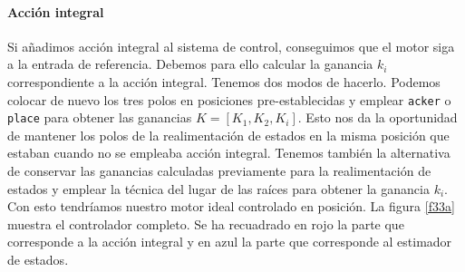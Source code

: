 \documentclass[10pt,a4paper]{report}
\begin{document}
\paragraph{Acción integral} Si añadimos acción integral al sistema de control, conseguimos que el motor siga a la entrada de referencia. Debemos para ello calcular la ganancia $k_i$ correspondiente a la acción integral. Tenemos dos modos de hacerlo. Podemos colocar de nuevo los tres polos en posiciones pre-establecidas y emplear \texttt{acker} o \texttt{place} para obtener las ganancias $K = [K_1,K_2,K_i]$. Esto nos da la oportunidad de mantener los polos de la realimentación de estados en la misma posición que estaban cuando no se empleaba acción integral. Tenemos también la alternativa de conservar las ganancias calculadas previamente para la realimentación de estados y emplear la técnica del lugar de las raíces para obtener la ganancia $k_i$. Con esto tendríamos nuestro motor ideal controlado en posición. La figura \ref{f33a} muestra el controlador completo. Se ha recuadrado en rojo la parte que corresponde a la acción integral y en azul la parte que corresponde al estimador de estados.
\end{document}
